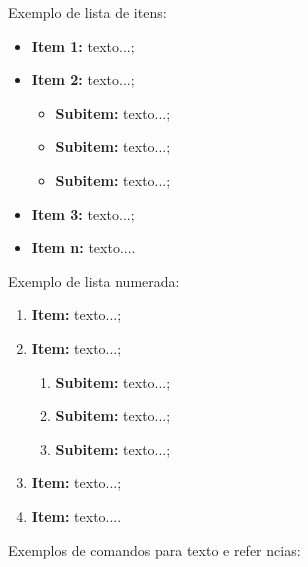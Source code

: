 \documentclass{article}
\begin{document}
     
     Exemplo de lista de itens:
     
     \begin{itemize}
     	\item \textbf{Item 1:} texto...;
     	\item \textbf{Item 2:} texto...;
     	\begin{itemize}
     		\item \textbf{Subitem:} texto...;
     		\item \textbf{Subitem:} texto...;
     		\item \textbf{Subitem:} texto...;
     	\end{itemize}
     	\item \textbf{Item 3:} texto...;
     	\item \textbf{Item n:} texto....
     \end{itemize}
     
     
     Exemplo de lista numerada:
     
     \begin{enumerate}
     	\item \textbf{Item:} texto...;
     	\item \textbf{Item:} texto...;
     	\begin{enumerate}
     		\item \textbf{Subitem:} texto...;
     		\item \textbf{Subitem:} texto...;
     		\item \textbf{Subitem:} texto...;
     	\end{enumerate}
     	\item \textbf{Item:} texto...;
     	\item \textbf{Item:} texto....
     \end{enumerate}
     
     
     Exemplos de comandos para texto e refer ncias:
     
\end{document}
